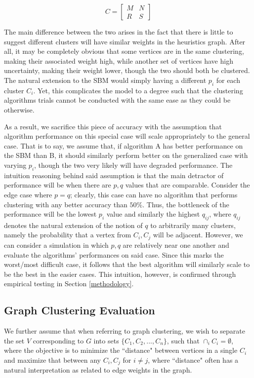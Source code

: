 \documentclass[journal]{IEEEtran}
\begin{document}
\[
C=
\left[
\begin{array}{c|c}
M & N \\
\hline
R & S
\end{array}
\right]
\]

The main difference between the two arises in the fact that there is little to suggest different clusters will have similar weights in the heuristics graph. After all, it may be completely obvious that some vertices are in the same clustering, making their associated weight high, while another set of vertices have high uncertainty, making their weight lower, though the two should both be clustered. The natural extension to the SBM would simply having a different $p_i$ for each cluster $C_i$. Yet, this complicates the model to a degree such that the clustering algorithms trials cannot be conducted with the same ease as they could be otherwise. 

As a result, we sacrifice this piece of accuracy with the assumption that algorithm performance on this special case will scale appropriately to the general case. That is to say, we assume that, if algorithm A has better performance on the SBM than B, it should similarly perform better on the generalized case with varying $p_i$, though the two very likely will have degraded performance. The intuition reasoning behind said assumption is that the main detractor of performance will be when there are $p,q$ values that are comparable. Consider the edge case where $p=q$; clearly, this case can have no algorithm that performs clustering with any better accuracy than $50\%$. Thus, the bottleneck of the performance will be the lowest $p_i$ value and similarly the highest $q_{ij}$, where $q_{ij}$ denotes the natural extension of the notion of $q$ to arbitrarily many clusters, namely the probability that a vertex from $C_i,C_j$ will be adjacent. However, we can consider a simulation in which $p,q$ are relatively near one another and evaluate the algorithms' performances on said case. Since this marks the worst/most difficult case, it follows that the best algorithm will similarly scale to be the best in the easier cases. This intuition, however, is confirmed through empirical testing in Section \ref{methodology}.



\subsection{Graph Clustering Evaluation}
We further assume that when referring to graph clustering, we wish to separate the set $V$ corresponding to $G$ into sets $\{C_1, C_2, ..., C_n\}$, such that $\cap_{i} C_{i} = \emptyset$, where the objective is to minimize the ``distance" between vertices in a single $C_i$ and maximize that between any $C_i,C_j$ for $i\neq j$, where ``distance" often has a natural interpretation as related to edge weights in the graph.
 
\end{document}
